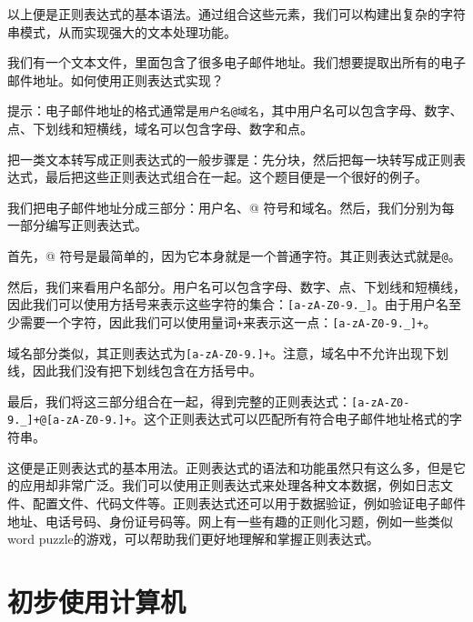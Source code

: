 以上便是正则表达式的基本语法。通过组合这些元素，我们可以构建出复杂的字符串模式，从而实现强大的文本处理功能。

\begin{example}
  我们有一个文本文件，里面包含了很多电子邮件地址。我们想要提取出所有的电子邮件地址。如何使用正则表达式实现？

  提示：电子邮件地址的格式通常是\texttt{用户名@域名}，其中用户名可以包含字母、数字、点、下划线和短横线，域名可以包含字母、数字和点。
\end{example}

\begin{answer}
  把一类文本转写成正则表达式的一般步骤是：先分块，然后把每一块转写成正则表达式，最后把这些正则表达式组合在一起。这个题目便是一个很好的例子。

  我们把电子邮件地址分成三部分：用户名、@ 符号和域名。然后，我们分别为每一部分编写正则表达式。

  首先，@ 符号是最简单的，因为它本身就是一个普通字符。其正则表达式就是\texttt{@}。

  然后，我们来看用户名部分。用户名可以包含字母、数字、点、下划线和短横线，因此我们可以使用方括号来表示这些字符的集合：\texttt{[a-zA-Z0-9.\_\-]}。由于用户名至少需要一个字符，因此我们可以使用量词\texttt{+}来表示这一点：\texttt{[a-zA-Z0-9.\_\-]+}。

  域名部分类似，其正则表达式为\texttt{[a-zA-Z0-9.\-]+}。注意，域名中不允许出现下划线，因此我们没有把下划线包含在方括号中。

  最后，我们将这三部分组合在一起，得到完整的正则表达式：\texttt{[a-zA-Z0-9.\_\-]+@[a-zA-Z0-9.\-]+}。这个正则表达式可以匹配所有符合电子邮件地址格式的字符串。
\end{answer}

这便是正则表达式的基本用法。正则表达式的语法和功能虽然只有这么多，但是它的应用却非常广泛。我们可以使用正则表达式来处理各种文本数据，例如日志文件、配置文件、代码文件等。正则表达式还可以用于数据验证，例如验证电子邮件地址、电话号码、身份证号码等。网上有一些有趣的正则化习题，例如一些类似word puzzle的游戏，可以帮助我们更好地理解和掌握正则表达式。

\section{初步使用计算机}

